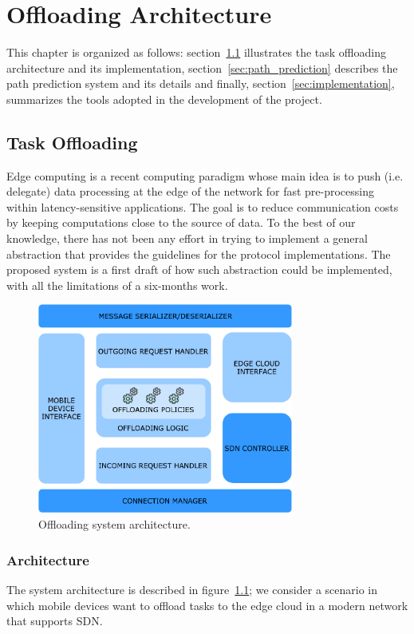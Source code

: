 \chapter{Offloading Architecture}
\label{ch:contribution}
This chapter is organized as follows: section~\ref{sec:task_off} illustrates the task offloading architecture and its implementation, section~\ref{sec:path_prediction} describes the path prediction system and its details and finally, section~\ref{sec:implementation}, summarizes the tools adopted in the development of the project.

\section{Task Offloading}
\label{sec:task_off}
Edge computing is a recent computing paradigm whose main idea is to push (i.e. delegate) data processing at the edge of the network for fast pre-processing within latency-sensitive applications. The goal is to reduce communication costs by keeping computations close to the source of data. To the best of our knowledge, there has not been any effort in trying to implement a general abstraction that provides the guidelines for the protocol implementations. The proposed system is a first draft of how such abstraction could be implemented, with all the limitations of a six-months work.
\begin{figure}[]
\centering
\includegraphics[width=0.75\textwidth]{img/off_sys_arch}
\caption{Offloading system architecture.}
\label{fig:offloading_system_arch}
\end{figure}


\subsection{Architecture}
The system architecture is described in figure~\ref{fig:offloading_system_arch}; we consider a scenario in which mobile devices want to offload tasks to the edge cloud in a modern network that supports SDN.

